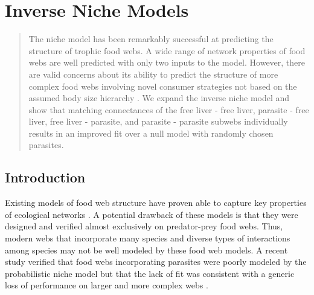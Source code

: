 \documentclass[/home/nkappler/Research/Dissertation/
 dissertation.tex]{subfiles}
\begin{document}
\chapter{Inverse Niche Models}

\begin{bibunit}

\begin{abstract} 

    The niche model \cite*{Williams2000} has been remarkably successful at
    predicting the structure of trophic food webs. A wide range of network
    properties of food webs are well predicted with only two inputs to the
    model. However, there are valid concerns about its ability to predict the
    structure of more complex food webs involving novel consumer strategies not
    based on the assumed body size hierarchy \cite*{Williams2011}. We expand the
    inverse niche model \cite*{Warren2010} and show that matching connectances
    of the free liver - free liver, parasite - free liver, free liver -
    parasite, and parasite - parasite subwebs individually results in an
    improved fit over a null model with randomly chosen parasites.  

\end{abstract}

\newpage

\section{Introduction}

Existing models of food web structure have proven able to capture key
properties of ecological networks \cite*{Williams2000, Allesina2008,
Williams2010, Williams2008b}. A potential drawback of these models is that they
were designed and verified almost exclusively on predator-prey food webs. Thus,
modern webs that incorporate many species and diverse types of interactions
among species \cite*{Kefi2016, Hechinger2011a, Thieltges2011, Zander2011,
Mouritsen2011} may not be well modeled by these food web models. A recent study
verified that food webs incorporating parasites were poorly modeled by the
probabilistic niche model but that the lack of fit was consistent with a
generic loss of performance on larger and more complex webs \cite*{Dunne2013}. 


\end{bibunit}
\end{document}
